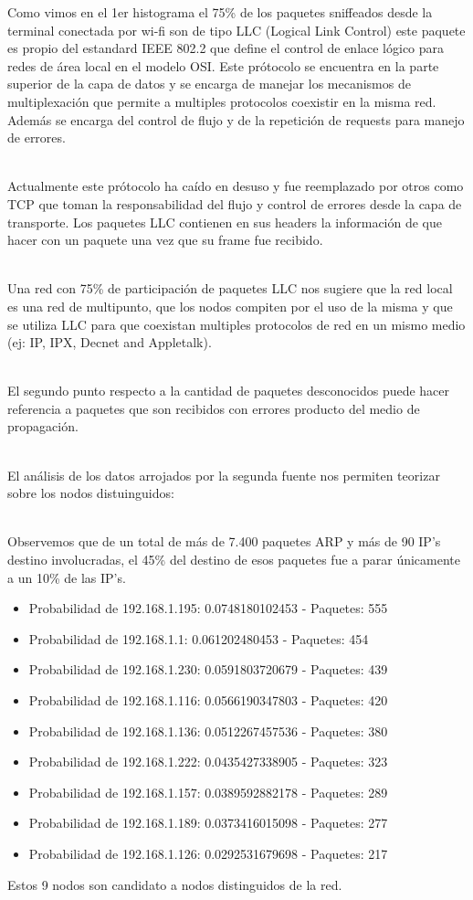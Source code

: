 Como vimos en el 1er histograma el 75\% de los paquetes sniffeados desde la terminal conectada por wi-fi son de tipo LLC (Logical Link Control) este paquete es propio del estandard IEEE 802.2 que define el control de enlace l\'ogico para redes de \'area local en el modelo OSI. Este pr\'otocolo se encuentra en la parte superior de la capa de datos y se encarga de manejar los mecanismos de multiplexaci\'on que permite a multiples protocolos coexistir en la misma red. Adem\'as se encarga del control de flujo y de la repetici\'on de requests para manejo de errores. \\\

Actualmente este pr\'otocolo ha ca\'ido en desuso y fue reemplazado por otros como TCP que toman la responsabilidad del flujo y control de errores desde la capa de transporte. Los paquetes LLC contienen en sus headers la informaci\'on de que hacer con un paquete una vez que su frame fue recibido. \\\

Una red con 75\% de participaci\'on de paquetes LLC nos sugiere que la red local es una red de multipunto, que los nodos compiten por el uso de la misma y que se utiliza LLC para que coexistan multiples protocolos de red en un mismo medio (ej: IP, IPX, Decnet and Appletalk). \\\

El segundo punto respecto a la cantidad de paquetes desconocidos puede hacer referencia a paquetes que son recibidos con errores producto del medio de propagaci\'on. \\\


El an\'alisis de los datos arrojados por la segunda fuente nos permiten teorizar sobre los nodos distuinguidos: \\\

Observemos que de un total de m\'as de 7.400 paquetes ARP y m\'as de 90 IP's destino involucradas, el 45\% del destino de esos paquetes fue a parar \'unicamente a un 10\% de las IP's.

\begin{itemize}
\item Probabilidad de 192.168.1.195: 0.0748180102453 - Paquetes: 555
\item Probabilidad de 192.168.1.1: 0.061202480453 - Paquetes: 454
\item Probabilidad de 192.168.1.230: 0.0591803720679 - Paquetes: 439
\item Probabilidad de 192.168.1.116: 0.0566190347803 - Paquetes: 420
\item Probabilidad de 192.168.1.136: 0.0512267457536 - Paquetes: 380
\item Probabilidad de 192.168.1.222: 0.0435427338905 - Paquetes: 323
\item Probabilidad de 192.168.1.157: 0.0389592882178 - Paquetes: 289
\item Probabilidad de 192.168.1.189: 0.0373416015098 - Paquetes: 277
\item Probabilidad de 192.168.1.126: 0.0292531679698 - Paquetes: 217
\end{itemize}

Estos 9 nodos son candidato a nodos distinguidos de la red.
